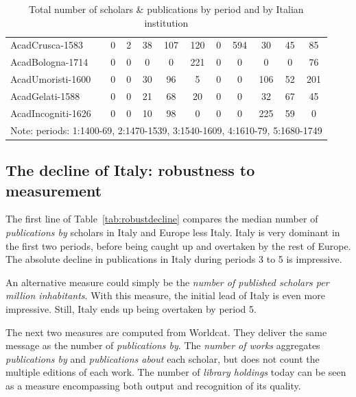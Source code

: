 \begin{table}[hb]
\begin{tabular}{@{ \extracolsep{3pt}}lcccccccccc}
AcadCrusca-1583 & 0        & 2        & 38       & 107      & 120      & 0        & 594      & 30       & 45       & 85 \\
AcadBologna-1714 & 0        & 0        & 0        & 0        & 221      & 0        & 0        & 0        & 0        & 76 \\
AcadUmoristi-1600 & 0        & 0        & 30       & 96       & 5        & 0        & 0        & 106      & 52       & 201 \\
AcadGelati-1588 & 0        & 0        & 21       & 68       & 20       & 0        & 0        & 32       & 67       & 45 \\
AcadIncogniti-1626 & 0        & 0        & 10       & 98       & 0        & 0        & 0        & 225      & 59       & 0 \\
\bottomrule
			\multicolumn{11}{l}{\footnotesize Note: periods: 1:1400-69, 2:1470-1539, 3:1540-1609, 4:1610-79, 5:1680-1749}
	\end{tabular}
	\caption{Total number of scholars \& publications by period and by Italian institution}\label{tab:publiIT}
\end{table}


\clearpage

\subsection{The decline of Italy: robustness to measurement} \label{app:robustdecline}

The first line of Table~\ref{tab:robustdecline} compares the median number of \textit{publications by}  scholars in Italy and Europe less Italy. Italy is very dominant in the first two periods, before being caught up and overtaken by the rest of Europe. The absolute decline in publications in Italy during periods 3 to 5 is impressive.

An alternative measure could simply be the \textit{number of published scholars per million inhabitants}. With this measure, the initial lead of  Italy is even more impressive. Still, Italy ends up being overtaken by period 5.

The next two  measures are computed from Worldcat. They deliver the same message as the number of \textit{publications by}. The \textit{number of works} aggregates \textit{publications by} and \textit{publications about} each scholar, but does not count the multiple editions of each work. The number of \textit{library holdings} today can be seen as a measure encompassing both output and recognition of its quality.

